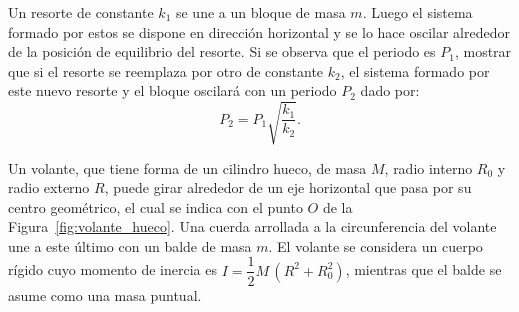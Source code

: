 \documentclass[addpoints]{exam}
\begin{document}
\begin{questions}

    \question Un resorte de constante $k_1$ se une a un bloque de masa $m$. Luego el sistema formado por estos se dispone en dirección horizontal y se lo hace oscilar alrededor de la posición de equilibrio del resorte. Si se observa que el periodo es $P_1$, mostrar que si el resorte se reemplaza por otro de constante $k_2$, el sistema formado por este nuevo resorte y el bloque oscilará con un periodo $P_2$ dado por: $$ P_2 = P_1 \sqrt{\frac{k_1}{k_2}}.$$
    
    \question \label{ej:volante_hueco} Un volante, que tiene forma de un cilindro hueco, de masa $M$, radio interno $R_0$ y radio externo $R$, puede girar alrededor de un eje horizontal que pasa por su centro geométrico, el cual se indica con el punto $O$ de la Figura~\ref{fig:volante_hueco}. Una cuerda arrollada a la circunferencia del volante une a este último con un balde de masa $m$. El volante se considera un cuerpo rígido cuyo momento de inercia es $I = \dfrac{1}{2} M \, \left(R^2 + R_0^2\right)$, mientras que el balde se asume como una masa puntual.

    \begin{figure}[ht]
        \centering
        \begin{subfigure}{0.45\textwidth}
\end{subfigure}
\end{figure}
\end{questions}
\end{document}
